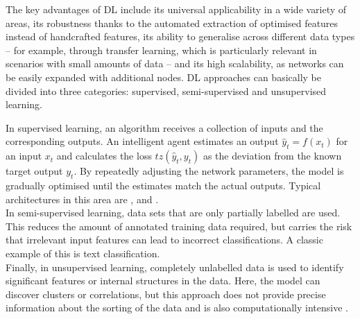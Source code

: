 The key advantages of \acrshort{DL} include its universal applicability in a wide variety of areas, its robustness thanks to the automated extraction of optimised features instead of handcrafted features, its ability to generalise across different data types – for example, through transfer learning, which is particularly relevant in scenarios with small amounts of data – and its high scalability, as networks can be easily expanded with additional nodes. DL approaches can basically be divided into three categories: supervised, semi-supervised and unsupervised learning\cite{Alzubaidi2021}.
  

In supervised learning, an algorithm receives a collection of inputs and the corresponding outputs. An intelligent agent estimates an output $\hat{y}_t = f(x_t)$ for an input $x_t$ and calculates the loss $tz(\hat{y}_t, y_t)$ as the deviation from the known target output $y_t$. By repeatedly adjusting the network parameters, the model is gradually optimised until the estimates match the actual outputs. Typical architectures in this area are ,  and . \\ In semi-supervised learning, data sets that are only partially labelled are used. This reduces the amount of annotated training data required, but carries the risk that irrelevant input features can lead to incorrect classifications. A classic example of this is text classification. \\ Finally, in unsupervised learning, completely unlabelled data is used to identify significant features or internal structures in the data. Here, the model can discover clusters or correlations, but this approach does not provide precise information about the sorting of the data and is also computationally intensive \cite{Alzubaidi2021}.
  

